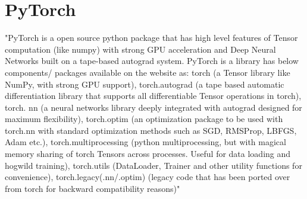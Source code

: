 \section{PyTorch}

"PyTorch is a open source python package that has high level features of Tensor computation 
(like numpy) with strong GPU acceleration and Deep Neural Networks built on a tape-based autograd 
system. PyTorch is a library has below components/ packages available on the website as: torch 
(a Tensor library like NumPy, with strong GPU support), torch.autograd (a tape based automatic
differentiation library that supports all differentiable Tensor operations in torch), torch.
nn (a neural networks library deeply integrated with autograd designed for maximum flexibility), 
torch.optim (an optimization package to be used with torch.nn with standard optimization methods
such as SGD, RMSProp, LBFGS, Adam etc.), torch.multiprocessing (python multiprocessing, but with
magical memory sharing of torch Tensors across processes. Useful for data loading and 
hogwild training), torch.utils (DataLoader, Trainer and other utility functions for convenience),
torch.legacy(.nn/.optim) (legacy code that has been ported over from torch for backward 
compatibility reasons)"~\cite{hid-sp18-520-PyTorch}
